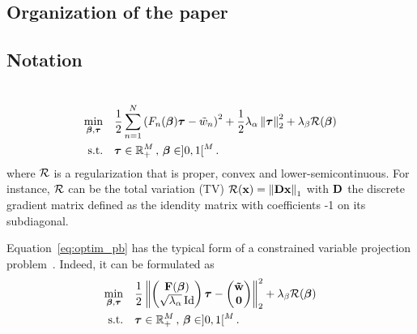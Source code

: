 \subsection{Organization of the paper}


\subsection{Notation}


\section{}



\section{}

\begin{equation}
  \label{eq:optim_pb}
  \begin{aligned}
    \min_{\bbeta,\btau} \quad &
    \frac{1}{2} \sum_{n=1}^{N} {\left(F_{n}(\bbeta)\btau - \tilde{w}_{n}\right)}^{2}
    +\frac{1}{2}\lambda_{\alpha}\norm{\btau}_{2}^{2} + \lambda_{\beta}\mR(\bbeta) \\
    \textrm{s.t.} \quad &
    \btau \in \RR^{M}_{+} \, , \, \bbeta \in ]0,1[^{M} \, .
  \end{aligned}
\end{equation}
where $\mathcal{R}$ is a regularization that is proper, convex and lower-semicontinuous.
For instance, $\mathcal{R}$ can be the total variation (TV) $\mathcal{R}(\mathbf{x})=\left\lVert\mathbf{D}\mathbf{x}\right\rVert_{1}$
with $\mathbf{D}$ the discrete gradient matrix defined as the idendity matrix with
coefficients -1 on its subdiagonal.

Equation~\eqref{eq:optim_pb} has the typical form of a constrained variable
projection problem~\cite{Golub_G_2003_j-inv-prob_separable_nlsvpma}.
Indeed, it can be formulated as
\begin{equation}
  \begin{aligned}
    \min_{\boldsymbol{\beta},\boldsymbol{\tau}} \quad &
    \frac{1}{2} \left\lVert\begin{pmatrix}\mathbf{F}(\boldsymbol{\beta}) \\ \sqrt{\lambda_{\alpha}}\operatorname{\mathrm{Id}}\end{pmatrix}\boldsymbol{\tau}
        - \begin{pmatrix}\boldsymbol{\tilde{\mathbf{w}}}\\ \mathbf{0} \end{pmatrix}\right\rVert_{2}^{2}
    + \lambda_{\beta}\mathcal{R}(\boldsymbol{\beta}) \\
    \textrm{s.t.} \quad &
    \boldsymbol{\tau} \in \mathbb{R}^{M}_{+} \, , \, \boldsymbol{\beta} \in ]0,1[^{M} \, .
  \end{aligned}
\end{equation}

